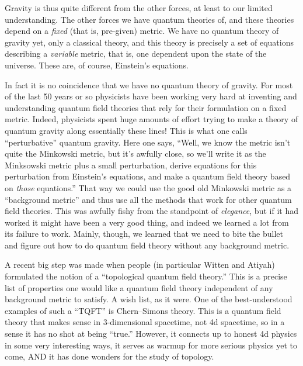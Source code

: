 \documentclass[12pt]{article}
\begin{document}
Gravity is thus quite different from the other forces, at least to our
limited understanding. The other forces we have quantum theories of, and
these theories depend on a \emph{fixed} (that is, pre-given) metric. We
have no quantum theory of gravity yet, only a classical theory, and this
theory is precisely a set of equations describing a \emph{variable}
metric, that is, one dependent upon the state of the universe. These
are, of course, Einstein's equations.

In fact it is no coincidence that we have no quantum theory of gravity.
For most of the last 50 years or so physicists have been working very
hard at inventing and understanding quantum field theories that rely for
their formulation on a fixed metric. Indeed, physicists spent huge
amounts of effort trying to make a theory of quantum gravity along
essentially these lines! This is what one calls ``perturbative'' quantum
gravity. Here one says, ``Well, we know the metric isn't quite the
Minkowski metric, but it's awfully close, so we'll write it as the
Minksowski metric plus a small perturbation, derive equations for this
perturbation from Einstein's equations, and make a quantum field theory
based on \emph{those} equations.'' That way we could use the good old
Minkowski metric as a ``background metric'' and thus use all the methods
that work for other quantum field theories. This was awfully fishy from
the standpoint of \emph{elegance}, but if it had worked it might have
been a very good thing, and indeed we learned a lot from its failure to
work. Mainly, though, we learned that we need to bite the bullet and
figure out how to do quantum field theory without any background metric.

A recent big step was made when people (in particular Witten and Atiyah)
formulated the notion of a ``topological quantum field theory.'' This is
a precise list of properties one would like a quantum field theory
independent of any background metric to satisfy. A wish list, as it
were. One of the best-understood examples of such a ``TQFT'' is
Chern--Simons theory. This is a quantum field theory that makes sense in
3-dimensional spacetime, not 4d spacetime, so in a sense it has no shot
at being ``true.'' However, it connects up to honest 4d physics in some
very interesting ways, it serves as warmup for more serious physics yet
to come, AND it has done wonders for the study of topology.
\end{document}
